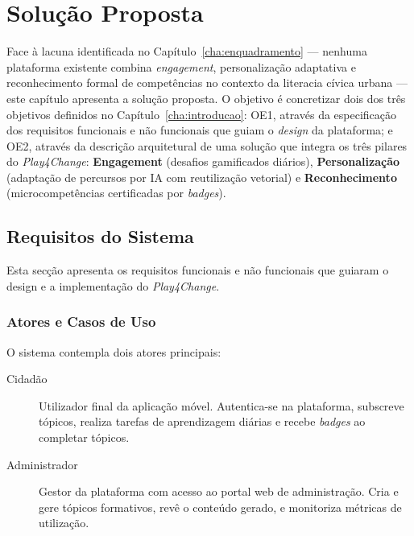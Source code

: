 %
%
\chapter{Solução Proposta}
\label{cha:solucao}

Face à lacuna identificada no Capítulo~\ref{cha:enquadramento} --- nenhuma plataforma existente combina \textit{engagement}, personalização adaptativa e reconhecimento formal de competências no contexto da literacia cívica urbana --- este capítulo apresenta a solução proposta. O objetivo é concretizar dois dos três objetivos definidos no Capítulo~\ref{cha:introducao}: OE1, através da especificação dos requisitos funcionais e não funcionais que guiam o \textit{design} da plataforma; e OE2, através da descrição arquitetural de uma solução que integra os três pilares do \textit{Play4Change}: \textbf{Engagement} (desafios gamificados diários), \textbf{Personalização} (adaptação de percursos por IA com reutilização vetorial) e \textbf{Reconhecimento} (microcompetências certificadas por \textit{badges}).

\section{Requisitos do Sistema}
\label{sec:requisitos}

Esta secção apresenta os requisitos funcionais e não funcionais que guiaram o design e a implementação do \textit{Play4Change}.

\subsection{Atores e Casos de Uso}
\label{ssec:casos_uso}

O sistema contempla dois atores principais:

\begin{description}
  \item[Cidadão] Utilizador final da aplicação móvel. Autentica-se na plataforma, subscreve tópicos, realiza tarefas de aprendizagem diárias e recebe \textit{badges} ao completar tópicos.
  \item[Administrador] Gestor da plataforma com acesso ao portal web de administração. Cria e gere tópicos formativos, revê o conteúdo gerado, e monitoriza métricas de utilização.
\end{description}

